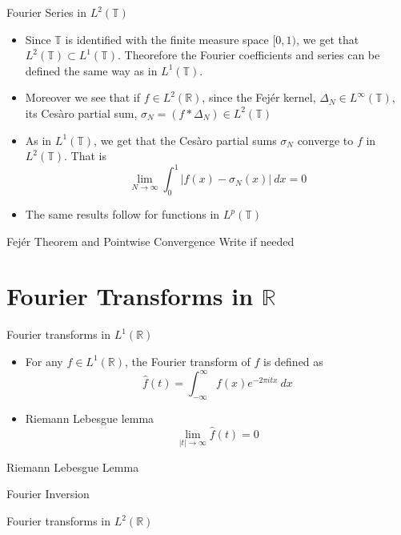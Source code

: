 \documentclass[compress]{beamer}
\newcommand{\R}{\mathbb R}
\newcommand{\T}{\mathbb T}
\begin{document}
\begin{frame}{Fourier Series in $L^2(\T)$}
  \begin{itemize}
    \item Since $\T$ is identified with the finite measure space $[0, 1)$, we get that $L^2(\T) \subset L^1(\T)$. Theorefore the Fourier coefficients and series can be defined the same way as in $L^1(\T)$.
    \item Moreover we see that if $f \in L^2(\R)$, since the Fej\'er kernel, $\Delta_N \in L^\infty(\T)$, its Ces\`aro partial sum, $\sigma_N = (f*\Delta_N) \in L^2(\T)$
    \item As in $L^1(\T)$, we get that the Ces\`aro partial sums $\sigma_N$ converge to $f$ in $L^2(\T)$. That is $$\lim_{N\to \infty} \int_0^1 \left| f(x) - \sigma_N(x)\right| \ dx  = 0 $$
    \item The same results follow for functions in $L^p(\T)$
  \end{itemize}
\end{frame}

\begin{frame}{Fej\'er Theorem and Pointwise Convergence}
  Write if needed
\end{frame}

\section{Fourier Transforms in $\R$}

\begin{frame}{Fourier transforms in $L^1(\R)$}
  \begin{itemize}
    \item For any $f\in L^1(\R)$, the Fourier transform of $f$ is defined as $$\hat{f}(t) = \int_{-\infty}^{\infty} f(x)e^{-2\pi i t x} \ dx $$
    \item Riemann Lebesgue lemma $$\lim_{|t| \to \infty} \hat{f}(t) = 0$$
  \end{itemize}
\end{frame}

\begin{frame}{Riemann Lebesgue Lemma}
\end{frame}

\begin{frame}{Fourier Inversion}
\end{frame}

\begin{frame}{Fourier transforms in $L^2(\R)$}
\end{frame}
\end{document}
